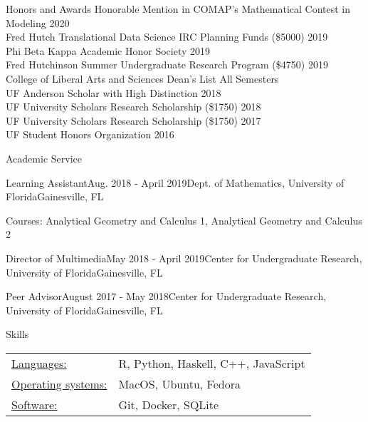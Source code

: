 \documentclass{resume}
\begin{document}
  \begin{rSection}{Honors and Awards}
  Honorable Mention in COMAP's Mathematical
  Contest in Modeling \hfill 2020 \\
  Fred Hutch Translational Data Science IRC Planning Funds (\$5000) \hfill 2019 \\
  Phi Beta Kappa Academic Honor Society \hfill 2019 \\
  Fred Hutchinson Summer Undergraduate Research Program (\$4750) \hfill 2019 \\
  College of Liberal Arts and Sciences Dean's List \hfill All Semesters \\
  UF Anderson Scholar with High Distinction \hfill 2018 \\
  UF University Scholars Research Scholarship (\$1750) \hfill 2018 \\
  UF University Scholars Research Scholarship (\$1750) \hfill 2017 \\
  UF Student Honors Organization \hfill 2016 
 \end{rSection}

 
\begin{rSection}{Academic Service}
  
\begin{rSubsection}{Learning Assistant}{Aug. 2018 - April
    2019}{Dept. of Mathematics, University of Florida}{Gainesville,
    FL}
   \item Courses: Analytical Geometry and Calculus 1, Analytical
    Geometry and Calculus 2
  \end{rSubsection}

 \begin{rSubsectionEmpty}{Director of Multimedia}{May 2018 - April 2019}{Center for Undergraduate Research, University of Florida}{Gainesville, FL}
\end{rSubsectionEmpty}


\begin{rSubsectionEmpty}{Peer Advisor}{August 2017 - May 2018}{Center for Undergraduate Research, University of Florida}{Gainesville, FL}
  \end{rSubsectionEmpty}

\end{rSection}
  

\begin{rSection}{Skills}
   \begin{tabular}{l p{3in}}
    \underline{Languages:} & R, Python, Haskell, C++, JavaScript \\
    \underline{Operating systems:} & MacOS, Ubuntu, Fedora \\
     \underline{Software:} & Git, Docker, SQLite
 \end{tabular}
\end{rSection}
\end{document}
